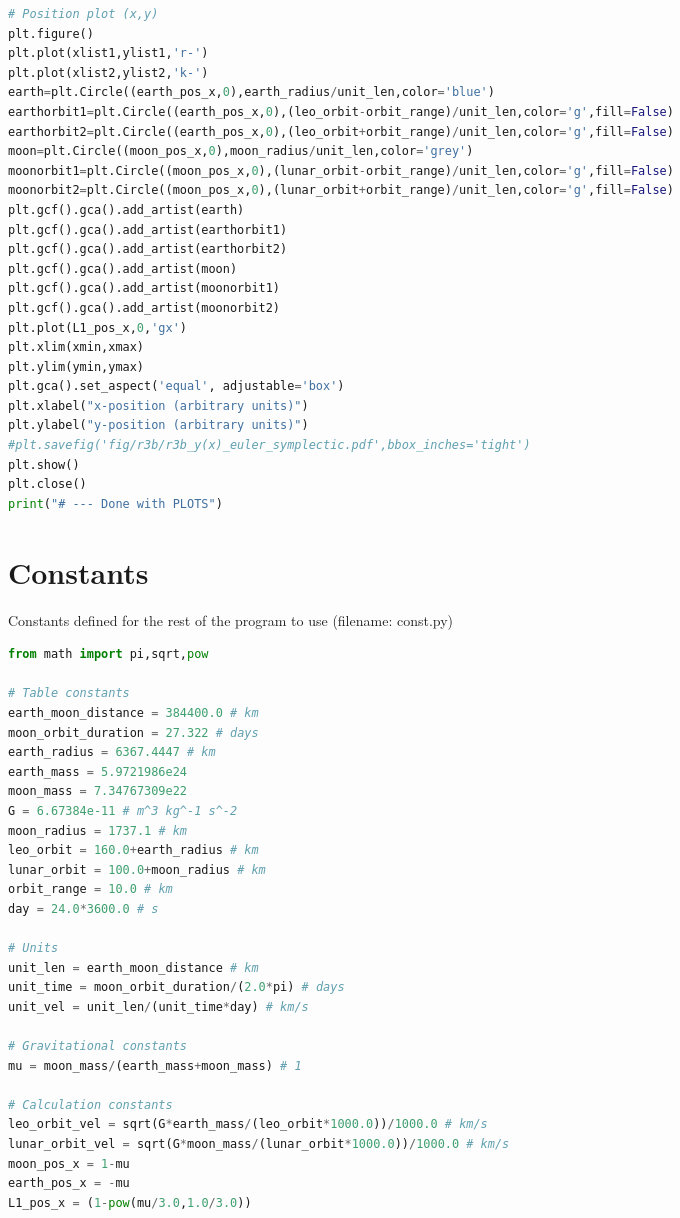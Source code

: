 \begin{adjustwidth*}{0cm}{-0.4cm}
\begin{lstlisting}[language=Python]
# Position plot (x,y)
plt.figure()
plt.plot(xlist1,ylist1,'r-')
plt.plot(xlist2,ylist2,'k-')
earth=plt.Circle((earth_pos_x,0),earth_radius/unit_len,color='blue')
earthorbit1=plt.Circle((earth_pos_x,0),(leo_orbit-orbit_range)/unit_len,color='g',fill=False)
earthorbit2=plt.Circle((earth_pos_x,0),(leo_orbit+orbit_range)/unit_len,color='g',fill=False)
moon=plt.Circle((moon_pos_x,0),moon_radius/unit_len,color='grey')
moonorbit1=plt.Circle((moon_pos_x,0),(lunar_orbit-orbit_range)/unit_len,color='g',fill=False)
moonorbit2=plt.Circle((moon_pos_x,0),(lunar_orbit+orbit_range)/unit_len,color='g',fill=False)
plt.gcf().gca().add_artist(earth)
plt.gcf().gca().add_artist(earthorbit1)
plt.gcf().gca().add_artist(earthorbit2)
plt.gcf().gca().add_artist(moon)
plt.gcf().gca().add_artist(moonorbit1)
plt.gcf().gca().add_artist(moonorbit2)
plt.plot(L1_pos_x,0,'gx')
plt.xlim(xmin,xmax)
plt.ylim(ymin,ymax)
plt.gca().set_aspect('equal', adjustable='box')
plt.xlabel("x-position (arbitrary units)")
plt.ylabel("y-position (arbitrary units)")
#plt.savefig('fig/r3b/r3b_y(x)_euler_symplectic.pdf',bbox_inches='tight')
plt.show()
plt.close()
print("# --- Done with PLOTS")
\end{lstlisting}
\end{adjustwidth*}


\section{Constants} \label{app:code-constants}
Constants defined for the rest of the program to use (filename: const.py)

\begin{adjustwidth*}{0cm}{-0.4cm}
\begin{lstlisting}[language=Python]
from math import pi,sqrt,pow

# Table constants
earth_moon_distance = 384400.0 # km
moon_orbit_duration = 27.322 # days
earth_radius = 6367.4447 # km
earth_mass = 5.9721986e24
moon_mass = 7.34767309e22
G = 6.67384e-11 # m^3 kg^-1 s^-2
moon_radius = 1737.1 # km
leo_orbit = 160.0+earth_radius # km
lunar_orbit = 100.0+moon_radius # km
orbit_range = 10.0 # km
day = 24.0*3600.0 # s

# Units
unit_len = earth_moon_distance # km
unit_time = moon_orbit_duration/(2.0*pi) # days
unit_vel = unit_len/(unit_time*day) # km/s

# Gravitational constants
mu = moon_mass/(earth_mass+moon_mass) # 1

# Calculation constants
leo_orbit_vel = sqrt(G*earth_mass/(leo_orbit*1000.0))/1000.0 # km/s
lunar_orbit_vel = sqrt(G*moon_mass/(lunar_orbit*1000.0))/1000.0 # km/s
moon_pos_x = 1-mu
earth_pos_x = -mu
L1_pos_x = (1-pow(mu/3.0,1.0/3.0))

\end{lstlisting}
\end{adjustwidth*}


